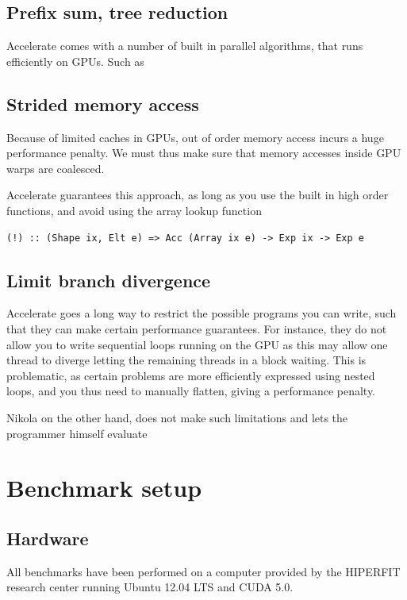 \subsection{Prefix sum, tree reduction}
Accelerate comes with a number of built in parallel algorithms, that
runs efficiently on GPUs. Such as

\subsection{Strided memory access}
Because of limited caches in GPUs, out of order memory access incurs a
huge performance penalty. We must thus make sure that memory accesses
inside GPU warps are coalesced.

Accelerate guarantees this approach, as long as you use the built in
high order functions, and avoid using the array lookup function
\begin{verbatim}
(!) :: (Shape ix, Elt e) => Acc (Array ix e) -> Exp ix -> Exp e
\end{verbatim}


\subsection{Limit branch divergence}
Accelerate goes a long way to restrict the possible programs you can
write, such that they can make certain performance guarantees. For
instance, they do not allow you to write sequential loops running on
the GPU as this may allow one thread to diverge letting the remaining
threads in a block waiting. This is problematic, as certain problems
are more efficiently expressed using nested loops, and you thus need
to manually flatten, giving a performance penalty.

Nikola on the other hand, does not make such limitations and lets the
programmer himself evaluate 

\section{Benchmark setup}

\subsection{Hardware}
All benchmarks have been performed on a computer provided by the
HIPERFIT research center running Ubuntu 12.04 LTS and CUDA 5.0.

